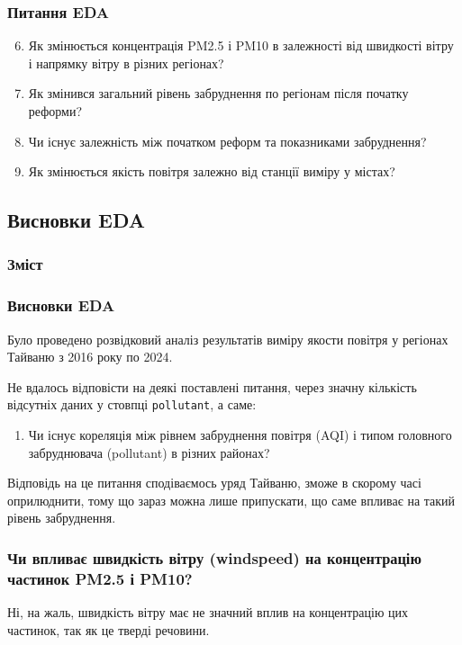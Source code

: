 \documentclass{beamer}
\begin{document}
\begin{frame}
  \frametitle{Питання EDA}

  \begin{enumerate}
    \setcounter{enumi}{5}

    \item Як змінюється концентрація PM2.5 і PM10 в залежності від швидкості вітру і напрямку вітру
    в різних регіонах?
    \item Як змінився загальний рівень забруднення по регіонам після початку реформи?
    \item Чи існує залежність між початком реформ та показниками забруднення?
    \item Як змінюється якість повітря залежно від станції виміру у містах?
  \end{enumerate}
\end{frame}

\begin{frame}
  \section{Висновки EDA}

  \frametitle{Зміст}
  \tableofcontents[currentsection]
\end{frame}

\begin{frame}[fragile=singleslide]
  \frametitle{Висновки EDA}

  Було проведено розвідковий аналіз результатів виміру якости повітря у регіонах Тайваню з 2016 року по 2024. 

  Не вдалось відповісти на деякі поставлені питання, 
  через значну кількість відсутніх даних у стовпці \verb|pollutant|, а саме: 
  \begin{enumerate}
    \item  Чи існує кореляція між рівнем забруднення повітря (AQI) і типом головного забруднювача (pollutant) в різних районах?  
  \end{enumerate}
  Відповідь на це питання сподіваємось уряд Тайваню, зможе в скорому часі оприлюднити, 
  тому що зараз можна лише припускати, що саме впливає на такий рівень забруднення.
\end{frame}


\begin{frame}
  \frametitle{Чи впливає швидкість вітру (windspeed) на концентрацію частинок PM2.5 і PM10?}

  Ні, на жаль, швидкість вітру має не значний вплив на концентрацію цих частинок, так як це тверді речовини. 

\end{frame}
\end{document}
